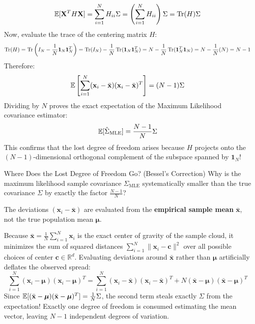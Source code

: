 \begin{equation}
\operatorname{\mathbb{E}}[\mathbf{X}^T H \mathbf{X}] = \sum_{i=1}^N H_{ii} \Sigma = \left( \sum_{i=1}^N H_{ii} \right) \Sigma = \operatorname{Tr}(H) \Sigma
\end{equation}
Now, evaluate the trace of the centering matrix $H$:
\begin{equation}
\operatorname{Tr}(H) = \operatorname{Tr}\left( I_N - \frac{1}{N}\mathbf{1}_N \mathbf{1}_N^T \right) = \operatorname{Tr}(I_N) - \frac{1}{N}\operatorname{Tr}(\mathbf{1}_N \mathbf{1}_N^T) = N - \frac{1}{N}\operatorname{Tr}(\mathbf{1}_N^T \mathbf{1}_N) = N - \frac{1}{N}(N) = N - 1
\end{equation}
Therefore:
\begin{equation}
\operatorname{\mathbb{E}}\left[ \sum_{i=1}^N (\mathbf{x}_i - \bar{\mathbf{x}})(\mathbf{x}_i - \bar{\mathbf{x}})^T \right] = (N - 1)\Sigma
\end{equation}
Dividing by $N$ proves the exact expectation of the Maximum Likelihood covariance estimator:
\begin{equation}
\operatorname{\mathbb{E}}[\hat{\Sigma}_{\text{MLE}}] = \frac{N - 1}{N}\Sigma
\end{equation}
This confirms that the lost degree of freedom arises because $H$ projects onto the $(N-1)$-dimensional orthogonal complement of the subspace spanned by $\mathbf{1}_N$!

\begin{ponderbox}{Where Does the Lost Degree of Freedom Go? (Bessel's Correction)}
Why is the maximum likelihood sample covariance $\hat{\Sigma}_{\text{MLE}}$ systematically smaller than the true covariance $\Sigma$ by exactly the factor $\frac{N-1}{N}$?

\tcblower
The deviations $(\mathbf{x}_i - \bar{\mathbf{x}})$ are evaluated from the \textbf{empirical sample mean} $\bar{\mathbf{x}}$, not the true population mean $\boldsymbol{\mu}$. 

Because $\bar{\mathbf{x}} = \frac{1}{N}\sum_{i=1}^N \mathbf{x}_i$ is the exact center of gravity of the sample cloud, it minimizes the sum of squared distances $\sum_{i=1}^N \|\mathbf{x}_i - \mathbf{c}\|^2$ over all possible choices of center $\mathbf{c} \in \mathbb{R}^d$. Evaluating deviations around $\bar{\mathbf{x}}$ rather than $\boldsymbol{\mu}$ artificially deflates the observed spread:
\begin{equation*}
\sum_{i=1}^N (\mathbf{x}_i - \boldsymbol{\mu})(\mathbf{x}_i - \boldsymbol{\mu})^T = \sum_{i=1}^N (\mathbf{x}_i - \bar{\mathbf{x}})(\mathbf{x}_i - \bar{\mathbf{x}})^T + N(\bar{\mathbf{x}} - \boldsymbol{\mu})(\bar{\mathbf{x}} - \boldsymbol{\mu})^T
\end{equation*}
Since $\operatorname{\mathbb{E}}[(\bar{\mathbf{x}} - \boldsymbol{\mu})(\bar{\mathbf{x}} - \boldsymbol{\mu})^T] = \frac{1}{N}\Sigma$, the second term steals exactly $\Sigma$ from the expectation! Exactly one degree of freedom is consumed estimating the mean vector, leaving $N-1$ independent degrees of variation.
\end{ponderbox}

